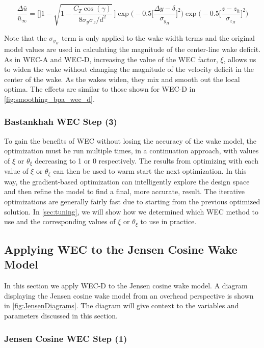 \documentclass[journal abbreviation, manuscript]{copernicus}
\begin{document}
	\begin{equation}
		\frac{\Delta \bar{u}}{\bar{u}_{\infty}} = \Bigg[]1-\sqrt{1-\frac{C_T \cos{(\gamma)}}{8 \sigma_y \sigma_z/d^2}}~\Bigg] \exp{\bigg(-0.5\Big[\frac{\Delta y-\delta}{ \sigma_{y_H}}\Big]^2\bigg)}\exp{\bigg(-0.5\Big[\frac{z-z_h}{ \sigma_{z_H}}\Big]^2\bigg)}
		\label{eq:wechapplied}
	\end{equation}
	
	Note that the $\sigma_{y_H}$ term is only applied to the wake width terms and the original model values are used in calculating the magnitude of the center-line wake deficit. As in WEC-A and WEC-D, increasing the value of the WEC factor, $\xi$, allows us to widen the wake without changing the magnitude of the velocity deficit in the center of the wake. As the wakes widen, they mix and smooth out the local optima. The effects are similar to those shown for WEC-D in \ref{fig:smoothing_bpa_wec_d}.
	
	\subsubsection{Bastankhah WEC Step (3)}
	To gain the benefits of WEC without losing the accuracy of the wake model, the optimization must be run multiple times, in a continuation approach, with values of $\xi$ or $\theta_\xi$ decreasing to 1 or 0 respectively. The results from optimizing with each value of $\xi$ or $\theta_\xi$ can then be used to warm start the next optimization. In this way, the gradient-based optimization can intelligently explore the design space and then refine the model to find a final, more accurate, result. The iterative optimizations are generally fairly fast due to starting from the previous optimized solution. In \ref{sec:tuning}, we will show how we determined which WEC method to use and the corresponding values of $\xi$ or $\theta_\xi$ to use in practice.
	
	\subsection{Applying WEC to the Jensen Cosine Wake Model}
	In this section we apply WEC-D to the Jensen cosine wake model. A diagram displaying the Jensen cosine wake model from an overhead perspective is shown in \ref{fig:JensenDiagrams}. The diagram will give context to the variables and parameters discussed in this section.
	
	\subsubsection{Jensen Cosine WEC Step (1)} 
	
\end{document}
